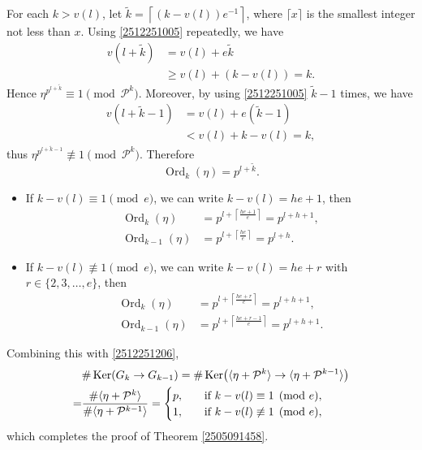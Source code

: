 \documentclass[12pt]{amsart}
\theoremstyle{plain}
\theoremstyle{definition}
\theoremstyle{remark}
\numberwithin{equation}{section}
\DeclareMathOperator{\ke}{Ker}
\begin{document}
	For each \( k > v(l) \), let \( \widetilde{k} = \left\lceil (k - v(l))e^{-1} \right\rceil \), where $\lceil x\rceil$ is the smallest integer not less than $x$. Using \eqref{2512251005} repeatedly, we have
	\[
	\begin{split}
		v(l+\tilde{k}) &= v(l) + e\widetilde{k}\\
		&\geq v(l) + (k - v(l)) = k.
	\end{split}
	\]
	Hence
	\(
	\eta^{p^{l+\widetilde{k}}} \equiv 1 \pmod{\mathcal{P}^k}
	\). Moreover, by using \eqref{2512251005} $\widetilde{k}-1$ times, we have
	\[
	\begin{split}
		v(l+\widetilde{k}-1) &= v(l) + e(\widetilde{k}-1)\\
		&< v(l) + k - v(l) = k,
	\end{split}
	\]
	thus $\eta^{p^{l+\widetilde{k}-1}} \not\equiv 1 \pmod{\mathcal{ P}^k}$. Therefore
	\begin{equation}
		\operatorname{Ord}_k(\eta)=p^{l+\widetilde{k}}.
	\end{equation}
	\begin{itemize}
		\item  If \( k - v(l) \equiv 1 \pmod{e} \), we can write \( k - v(l) = h e + 1 \), then
		\[
		\begin{split}
			\operatorname{Ord}_k(\eta) &= p^{l + \left\lceil \frac{h e + 1}{e} \right\rceil}
			= p^{l + h + 1},\\
			\operatorname{Ord}_{k-1}(\eta) &= p^{l + \left\lceil \frac{h e}{e} \right\rceil}
			= p^{l + h}.
		\end{split}
		\]
		\item  If \( k -v(l) \not\equiv 1 \pmod{e} \), we can write \( k - v(l) = h e + r \) with $r\in\{2,3,\dots,e\}$, then
		\[
		\begin{split}
			\operatorname{Ord}_k(\eta) &= p^{l + \left\lceil \frac{h e + r}{e} \right\rceil}
			= p^{l + h + 1},\\
			\operatorname{Ord}_{k-1}(\eta) &= p^{l + \left\lceil \frac{h e+r-1}{e} \right\rceil}
			= p^{l + h+1}.
		\end{split}
		\]
	\end{itemize}
	Combining this with \eqref{2512251206}, 
	\[
	\begin{split}
		&\#\ke(G_k\to G_{k-1})=\#\ke\bigl( \langle \eta + \mathcal{ P}^k \rangle \to \langle \eta + \mathcal{ P}^{k-1} \rangle \bigr) \\
		=& \frac{\#\langle\eta + \mathcal{ P}^k \rangle}{\#\langle  \eta + \mathcal{ P}^{k-1}\rangle}
		=\begin{cases}
			p,&\quad\text{if \( k - v(l) \equiv 1 \pmod{e} \)},\\
			1,&\quad\text{if \( k - v(l) \not\equiv 1 \pmod{e} \)},
		\end{cases}
	\end{split}
	\]
	which completes the proof of Theorem \ref{2505091458}.
	
\end{document}
